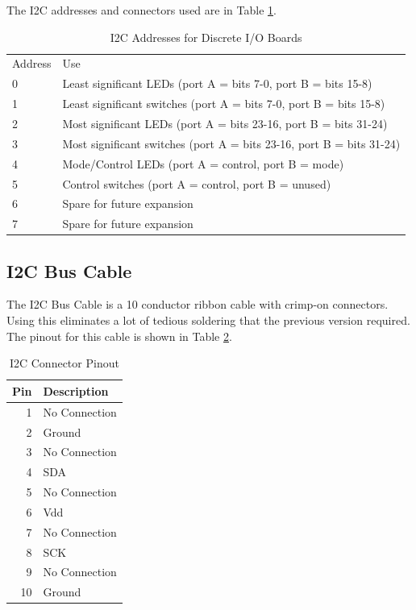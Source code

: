 \documentclass[10pt, openany]{book}
\begin{document}
The I2C addresses and connectors used are in Table \ref{tbl:i2c}.

\begin{table}
  \label{tbl:i2c}
  \caption{I2C Addresses for Discrete I/O Boards}
  \centering
  \begin{tabular}{|l|l|}
    \hline
    Address & Use\\
    0 & Least significant LEDs (port A = bits 7-0, port B = bits 15-8)\\
    1 & Least significant switches (port A = bits 7-0, port B = bits 15-8)\\
    2 & Most significant LEDs (port A = bits 23-16, port B = bits 31-24)\\
    3 & Most significant switches (port A = bits 23-16, port B = bits 31-24)\\
    4 & Mode/Control LEDs (port A = control, port B = mode)\\
    5 & Control switches (port A = control, port B = unused)\\
    6 & Spare for future expansion\\
    7 & Spare for future expansion\\
    \hline
  \end{tabular}
\end{table}

\subsection{I2C Bus Cable}
The I2C Bus Cable is a 10 conductor ribbon cable with crimp-on connectors.  Using this eliminates a lot of tedious soldering that the previous version required.  The pinout for this cable is shown in Table \ref{tbl:I2C-Pins}.

\begin{table}
  \label{tbl:I2C-Pins}
  \caption{I2C Connector Pinout}
  \centering
  \begin{tabular}{|r|l|}
    \hline
    Pin & Description\\
    \hline
    1 & No Connection\\
    2 & Ground\\
    3 & No Connection\\
    4 & SDA\\
    5 & No Connection\\
    6 & Vdd\\
    7 & No Connection\\
    8 & SCK\\
    9 & No Connection\\
    10 & Ground\\
    \hline
  \end{tabular}
\end{table}
\end{document}
